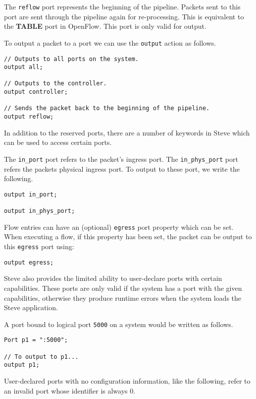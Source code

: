 The \texttt{reflow} port represents the beginning of the pipeline. Packets sent to this port are sent through the pipeline again for re-processing. This is equivalent to the \textbf{TABLE} port in OpenFlow. This port is only valid for output.

To output a packet to a port we can use the \texttt{output} action as follows.

\begin{lstlisting}
// Outputs to all ports on the system.
output all; 

// Outputs to the controller.
output controller; 

// Sends the packet back to the beginning of the pipeline.
output reflow; 
\end{lstlisting}

In addition to the reserved ports, there are a number of keywords in Steve which can be used to access certain ports.

The \texttt{in\_port} port refers to the packet's ingress port. The \texttt{in\_phys\_port} port refers the packets physical ingress port. To output to these port, we write the following.

\begin{lstlisting}
output in_port;

output in_phys_port;
\end{lstlisting}

Flow entries can have an (optional) \texttt{egress} port property which can be set. When executing a flow, if this property has been set, the packet can be output to this \texttt{egress} port using:

\begin{lstlisting}
output egress;
\end{lstlisting}

Steve also provides the limited ability to user-declare ports with certain capabilities. These ports are only valid if the system has a port with the given capabilities, otherwise they produce runtime errors when the system loads the Steve application.

A port bound to logical port \texttt{5000} on a system would be written as follows.

\begin{lstlisting}
Port p1 = ":5000";

// To output to p1...
output p1;
\end{lstlisting}

User-declared ports with no configuration information, like the following, refer to an invalid port whose identifier is always 0. 

